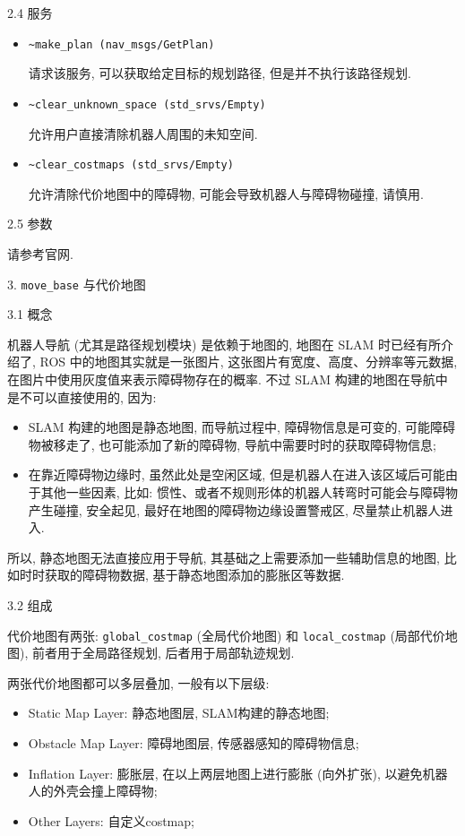 \documentclass[openany, fontset=windowsold]{ctexbook}
\theoremstyle{kaiti}
\theoremstyle{normal}
\begin{document}
2.4 服务

\begin{itemize}
  \item \verb|~make_plan (nav_msgs/GetPlan)|

  请求该服务, 可以获取给定目标的规划路径, 但是并不执行该路径规划.

  \item \verb|~clear_unknown_space (std_srvs/Empty)|

  允许用户直接清除机器人周围的未知空间.

  \item \verb|~clear_costmaps (std_srvs/Empty)|

  允许清除代价地图中的障碍物, 可能会导致机器人与障碍物碰撞, 请慎用.
\end{itemize}

2.5 参数

请参考官网.

3. \verb|move_base| 与代价地图

3.1 概念

机器人导航 (尤其是路径规划模块) 是依赖于地图的, 地图在 SLAM 时已经有所介绍了, ROS 中的地图其实就是一张图片, 这张图片有宽度、高度、分辨率等元数据, 在图片中使用灰度值来表示障碍物存在的概率. 不过 SLAM 构建的地图在导航中是不可以直接使用的, 因为: 

\begin{itemize}
  \item SLAM 构建的地图是静态地图, 而导航过程中, 障碍物信息是可变的, 可能障碍物被移走了, 也可能添加了新的障碍物, 导航中需要时时的获取障碍物信息; 
  \item 在靠近障碍物边缘时, 虽然此处是空闲区域, 但是机器人在进入该区域后可能由于其他一些因素, 比如: 惯性、或者不规则形体的机器人转弯时可能会与障碍物产生碰撞, 安全起见, 最好在地图的障碍物边缘设置警戒区, 尽量禁止机器人进入.
\end{itemize}

所以, 静态地图无法直接应用于导航, 其基础之上需要添加一些辅助信息的地图, 比如时时获取的障碍物数据, 基于静态地图添加的膨胀区等数据.

3.2 组成

代价地图有两张: \verb|global_costmap| (全局代价地图) 和 \verb|local_costmap| (局部代价地图), 前者用于全局路径规划, 后者用于局部轨迹规划.

两张代价地图都可以多层叠加, 一般有以下层级:

\begin{itemize}
  \item Static Map Layer: 静态地图层, SLAM构建的静态地图;
  \item Obstacle Map Layer: 障碍地图层, 传感器感知的障碍物信息;
  \item Inflation Layer: 膨胀层, 在以上两层地图上进行膨胀 (向外扩张), 以避免机器人的外壳会撞上障碍物;
  \item Other Layers: 自定义costmap;
\end{itemize}
\end{document}
